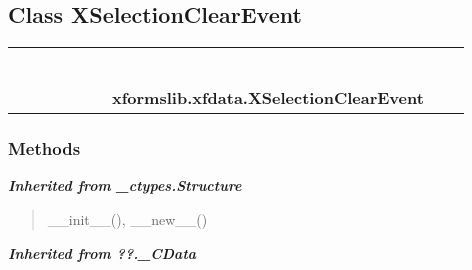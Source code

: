 
\subsection{Class XSelectionClearEvent}

    \label{xformslib:xfdata:XSelectionClearEvent}
\begin{tabular}{cccccccccc}
\multicolumn{2}{r}{\settowidth{\BCL}{object}\multirow{2}{\BCL}{object}}
&&
&&
&&
  \\\cline{3-3}
  &&\multicolumn{1}{c|}{}
&&
&&
&&
  \\
\multicolumn{4}{r}{\settowidth{\BCL}{??.\_CData}\multirow{2}{\BCL}{??.\_CData}}
&&
&&
  \\\cline{5-5}
  &&&&\multicolumn{1}{c|}{}
&&
&&
  \\
\multicolumn{6}{r}{\settowidth{\BCL}{\_ctypes.Structure}\multirow{2}{\BCL}{\_ctypes.Structure}}
&&
  \\\cline{7-7}
  &&&&&&\multicolumn{1}{c|}{}
&&
  \\
&&&&&&\multicolumn{2}{l}{\textbf{xformslib.xfdata.XSelectionClearEvent}}
\end{tabular}



  \subsubsection{Methods}


\large{\textbf{\textit{Inherited from \_ctypes.Structure}}}

\begin{quote}
\_\_init\_\_(), \_\_new\_\_()
\end{quote}

\large{\textbf{\textit{Inherited from ??.\_CData}}}

